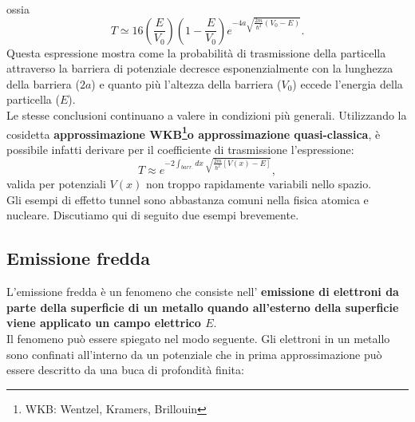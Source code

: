 \documentclass[a4paper,11pt,oneside]{book}
\begin{document}
ossia
\begin{equation}
T \simeq 16 \left(\frac{E}{V_0} \right) \left(1-\frac{E}{V_0}\right) e^{-4a\sqrt{\frac{2m}{\hbar ^2}\left(V_0-E\right)}}.
\end{equation}
Questa espressione mostra come la probabilità di trasmissione della particella attraverso la barriera di potenziale decresce esponenzialmente con la lunghezza della barriera ($2a$) e quanto più l'altezza della barriera ($V_0$) eccede l'energia della particella ($E$).\\
Le stesse conclusioni continuano a valere in condizioni più generali. Utilizzando la cosidetta \textbf{approssimazione WKB\footnote{WKB: Wentzel, Kramers, Brillouin}o approssimazione quasi-classica}, è possibile infatti derivare per il coefficiente di trasmissione l'espressione:
\begin{equation}
T \approx e^{-2 \int_{barr.} dx\ \sqrt{\frac{2m}{\hbar ^2}\left[ V(x)-E \right]}},
\end{equation}
valida per potenziali $V(x)$ non troppo rapidamente variabili nello spazio.\\
Gli esempi di effetto tunnel sono abbastanza comuni nella fisica atomica e nucleare. Discutiamo qui di seguito due esempi brevemente.
\subsection{Emissione fredda}
L'emissione fredda è un fenomeno che consiste nell' \textbf{emissione di elettroni da parte della superficie di un metallo quando all'esterno della superficie viene applicato un campo elettrico $E$}.\\
Il fenomeno può essere spiegato nel modo seguente. Gli elettroni in un metallo sono confinati all'interno da un potenziale che in prima approssimazione può essere descritto da una buca di profondità finita:
\end{document}
